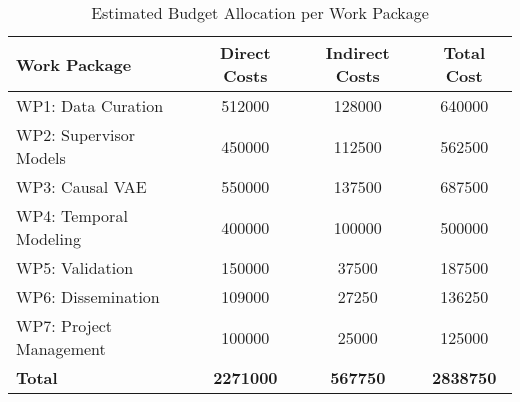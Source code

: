 \begin{table}[H]
\centering
\caption{Estimated Budget Allocation per Work Package}
\label{tab:budget_wp}
\begin{tabular}{lS[table-format=7.0]S[table-format=7.0]S[table-format=7.0]}
\toprule
\textbf{Work Package} & \textbf{Direct Costs} & \textbf{Indirect Costs} & \textbf{Total Cost} \\
\midrule
WP1: Data Curation & 512000 & 128000 & 640000 \\
WP2: Supervisor Models & 450000 & 112500 & 562500 \\
WP3: Causal VAE & 550000 & 137500 & 687500 \\
WP4: Temporal Modeling & 400000 & 100000 & 500000 \\
WP5: Validation & 150000 & 37500 & 187500 \\
WP6: Dissemination & 109000 & 27250 & 136250 \\
WP7: Project Management & 100000 & 25000 & 125000 \\
\midrule
\textbf{Total} & \textbf{2271000} & \textbf{567750} & \textbf{2838750} \\
\bottomrule
\end{tabular}
\end{table}